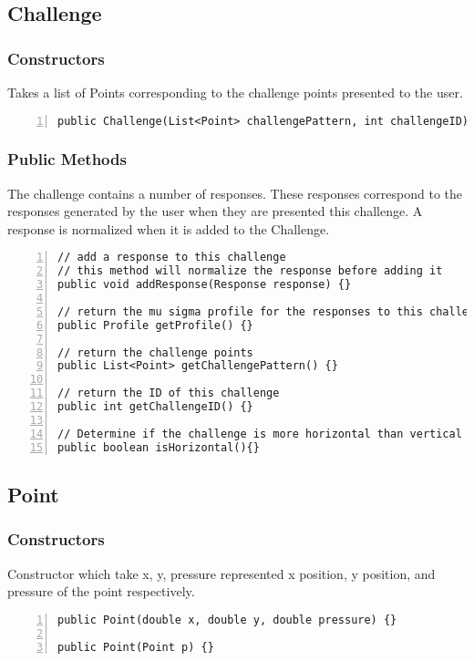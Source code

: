 \documentclass{article} %
\begin{document}
\subsection{Challenge}
\subsubsection{Constructors}
Takes a list of Points corresponding to the challenge points presented to the user.
\begin{lstlisting}[numbers=left]
public Challenge(List<Point> challengePattern, int challengeID) {}
\end{lstlisting}

\subsubsection{Public Methods}
The challenge contains a number of responses. These responses correspond to the responses generated by the user when they are presented this challenge. A response is normalized when it is added to the Challenge.
\begin{lstlisting}[numbers=left]
// add a response to this challenge
// this method will normalize the response before adding it
public void addResponse(Response response) {}

// return the mu sigma profile for the responses to this challenge
public Profile getProfile() {}

// return the challenge points
public List<Point> getChallengePattern() {}

// return the ID of this challenge
public int getChallengeID() {}

// Determine if the challenge is more horizontal than vertical in oreantation
public boolean isHorizontal(){}
\end{lstlisting}

\subsection{Point}
\subsubsection{Constructors}
Constructor which take x, y, pressure represented x position, y position, and pressure of the point respectively.
\begin{lstlisting}[numbers=left]
public Point(double x, double y, double pressure) {}

public Point(Point p) {}
\end{lstlisting}
\end{document}

